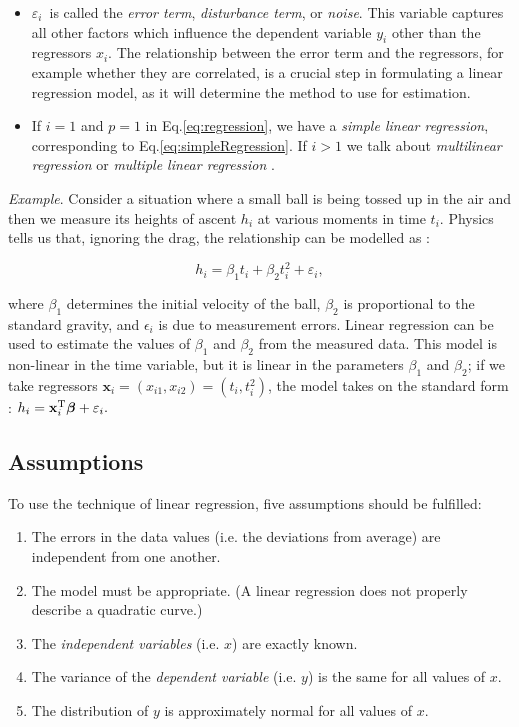 \begin{itemize}
  \item $\varepsilon_i\,$ is called the \emph{error term}, \emph{disturbance term}, or \emph{noise}. This variable captures all other factors which influence the dependent variable $y_i$ other than the regressors $x_i$. The relationship between the error term and the regressors, for example whether they are correlated, is a crucial step in formulating a linear regression model, as it will determine the method to use for estimation.
  \item If $i=1$ and $p=1$ in Eq.\ref{eq:regression}, we have a \emph{simple linear regression}, corresponding to Eq.\ref{eq:simpleRegression}. If $i>1$ we talk about \emph{multilinear regression}  or \emph{multiple linear regression} .

\end{itemize}
\emph{Example}. Consider a situation where a small ball is being tossed up in the air and then we measure its heights of ascent $h_i$ at various moments in time $t_i$. Physics tells us that, ignoring the drag, the relationship can be modelled as
:

\begin{equation}
 h_i = \beta_1 t_i + \beta_2 t_i^2 + \varepsilon_i,
\end{equation}

where $\beta_1$ determines the initial velocity of the ball, $\beta_2$ is proportional to the standard gravity, and $\epsilon_i$ is due to measurement errors. Linear regression can be used to estimate the values of $\beta_1$ and $\beta_2$ from the measured data. This model is non-linear in the time variable, but it is linear in the parameters $\beta_1$ and $\beta_2$; if we take regressors $\mathbf{x}_i = (x_{i1},x_{i2}) = (t_i,t_i^2)$, the model takes on the standard form
:
 $h_i = \mathbf{x}^{\rm T}_i\boldsymbol\beta + \varepsilon_i.$

\subsection{Assumptions}

To use the technique of linear regression, five assumptions should be fulfilled:

\begin{enumerate}
  \item The errors in the data values (i.e. the deviations from average) are independent from one another.
  \item The model must be appropriate. (A linear regression does not properly describe a quadratic curve.)
  \item The \emph{independent variables} (i.e. $x$) are exactly known.
  \item The variance of the \emph{dependent variable} (i.e. $y$) is the same for all values of $x$.
  \item The distribution of $y$ is approximately normal for all values of $x$.
\end{enumerate}

